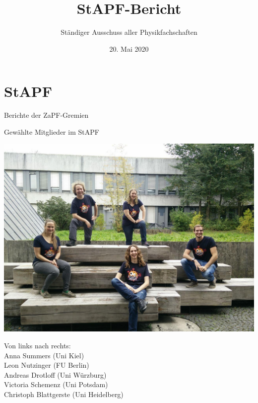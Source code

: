\documentclass[compress, aspectratio=169]{beamer}
\title[StAPf-Bericht]{StAPF-Bericht}
\author{Ständiger Ausschuss aller Physikfachschaften}
\institute[Zusammenkunft aller Physikfachschaften]
\date{20. Mai 2020}
\begin{document}
\begin{frame}[plain]{}
  \titlepage
\end{frame}


\section{StAPF}

\begin{frame}
\centering
\Huge Berichte der ZaPF-Gremien
\end{frame}


\begin{frame}{Gewählte Mitglieder im StAPF}
\begin{minipage}{.5\textwidth}
\centering
\includegraphics[width=.9\textwidth]{StAPF.jpg}
\vspace{.5cm}
\end{minipage}
\begin{minipage}{.45\textwidth}
Von links nach rechts:\\

Anna Summers (Uni Kiel)\\

Leon Nutzinger (FU Berlin)\\

Andreas Drotloff (Uni Würzburg)\\

Victoria Schemenz (Uni Potsdam)\\

Christoph Blattgerste (Uni Heidelberg)\\
\end{minipage}
\end{frame}
\end{document}
